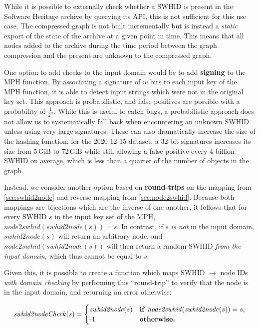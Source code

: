 While it is possible to externally check whether a \gls{SWHID} is present in
the Software Heritage archive by querying its API, this is not sufficient for
this use case. The compressed graph is not built incrementally but is instead a
\emph{static} export of the state of the archive at a given point in time. This
means that all nodes added to the archive during the time period between
the graph compression and the present are unknown to the compressed graph.

One option to add checks to the input domain would be to add \textbf{signing} to
the \gls{MPH} function. By associating a signature of $w$ bits to each input
key of the \gls{MPH} function, it is able to detect input strings which were
not in the original key set. This approach is probabilistic, and false
positives are possible with a probability of {\Large $\frac{1}{2^w}$}. While
this is useful to catch bugs, a probabilistic approach does not allow us to
systematically fall back when encountering an unknown \gls{SWHID} unless using
very large signatures. These can also dramatically increase the size of the
hashing function: for the 2020-12-15 dataset, a 32-bit signatures increases its
size from 5\,GiB to 72\,GiB while still allowing a false positive every 4
billion \gls{SWHID} on average, which is less than a quarter of the number of
objects in the graph.

Instead, we consider another option based on \textbf{round-trips} on the
mapping from \cref{sec:swhid2node} and reverse mapping from
\cref{sec:node2swhid}.  Because both mappings are bijections which are
the inverse of one another, it follows that for every \gls{SWHID} $s$ in the
input key set of the \gls{MPH}, $\mathit{node2swhid}(\mathit{swhid2node}(s)) =
s$.  In contrast, if $s$ \emph{is not} in the input domain,
$\mathit{swhid2node}(s)$ will return an arbitrary node, and
$\mathit{node2swhid}(\mathit{swhid2node}(s))$ will then return a random
\gls{SWHID} \emph{from the input domain}, which thus cannot be equal to $s$.

Given this, it is possible to create a function which maps \gls{SWHID} $\to$
node IDs \emph{with domain checking} by performing this ``round-trip'' to
verify that the node is in the input domain, and returning an error otherwise:

\[
    \mathit{swhid2nodeCheck}(s) =
    \begin{cases}
        \mathit{swhid2node}(s) &
        \text{\textbf{if}}~\mathit{node2swhid}(\mathit{swhid2node}(s)) = s,\\
        \text{-1}            & \text{\textbf{otherwise.}}
    \end{cases}
\]

